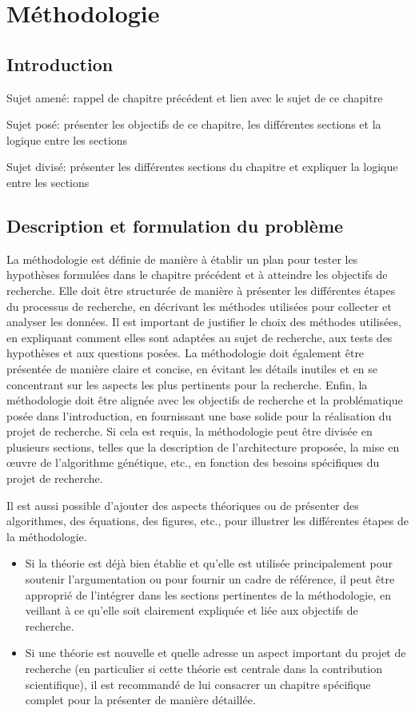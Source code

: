 \chapter{Méthodologie}
\label{chap:chap_3}
\section*{Introduction}

Sujet amené: rappel de chapitre précédent et lien avec le sujet de ce chapitre\par
Sujet posé: présenter les objectifs de ce chapitre, les différentes sections et la logique entre les sections\par
Sujet divisé: présenter les différentes sections du chapitre et expliquer la logique entre les sections\par


\section{Description et formulation du problème}

La méthodologie est définie de manière à établir un plan pour tester les hypothèses formulées dans le chapitre précédent et à atteindre les objectifs de recherche. Elle doit être structurée de manière à présenter les différentes étapes du processus de recherche, en décrivant les méthodes utilisées pour collecter et analyser les données. Il est important de justifier le choix des méthodes utilisées, en expliquant comment elles sont adaptées au sujet de recherche, aux tests des hypothèses et aux questions posées. La méthodologie doit également être présentée de manière claire et concise, en évitant les détails inutiles et en se concentrant sur les aspects les plus pertinents pour la recherche. Enfin, la méthodologie doit être alignée avec les objectifs de recherche et la problématique posée dans l'introduction, en fournissant une base solide pour la réalisation du projet de recherche. Si cela est requis, la méthodologie peut être divisée en plusieurs sections, telles que la description de l'architecture proposée, la mise en œuvre de l'algorithme génétique, etc., en fonction des besoins spécifiques du projet de recherche. 

Il est aussi possible d'ajouter des aspects théoriques ou de présenter des algorithmes, des équations, des figures, etc., pour illustrer les différentes étapes de la méthodologie. 
\begin{itemize}
    \item Si la théorie est déjà bien établie et qu'elle est utilisée principalement pour soutenir l'argumentation ou pour fournir un cadre de référence, il peut être approprié de l'intégrer dans les sections pertinentes de la méthodologie, en veillant à ce qu'elle soit clairement expliquée et liée aux objectifs de recherche.
    \item Si une théorie est nouvelle et quelle adresse un aspect important du projet de recherche (en particulier si cette théorie est centrale dans la contribution scientifique), il est recommandé de lui consacrer un chapitre spécifique complet pour la présenter de manière détaillée.
\end{itemize}

